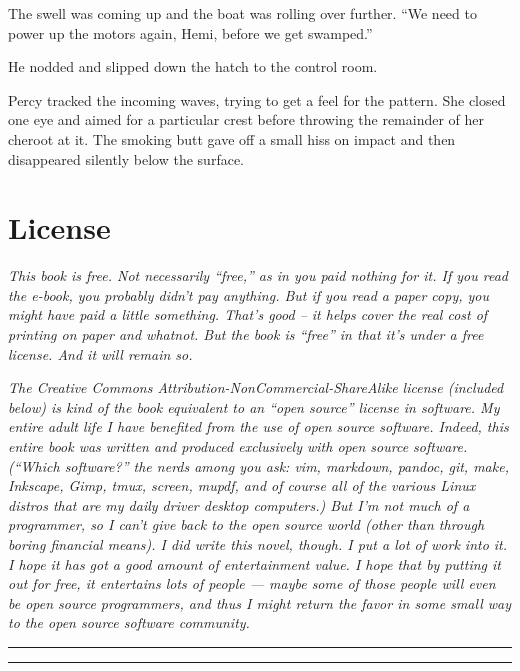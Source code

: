 \documentclass[
]{scrbook}
\begin{document}
The swell was coming up and the boat was rolling over further. ``We need
to power up the motors again, Hemi, before we get swamped.''

He nodded and slipped down the hatch to the control room.

Percy tracked the incoming waves, trying to get a feel for the pattern.
She closed one eye and aimed for a particular crest before throwing the
remainder of her cheroot at it. The smoking butt gave off a small hiss
on impact and then disappeared silently below the surface.

\newpage

\hypertarget{license}{%
\section{License}\label{license}}

\emph{This book is free. Not necessarily ``free,'' as in you paid
nothing for it. If you read the e-book, you probably didn't pay
anything. But if you read a paper copy, you might have paid a little
something. That's good -- it helps cover the real cost of printing on
paper and whatnot. But the book is ``free'' in that it's under a free
license. And it will remain so.}

\emph{The Creative Commons Attribution-NonCommercial-ShareAlike license
(included below) is kind of the book equivalent to an ``open source''
license in software. My entire adult life I have benefited from the use
of open source software. Indeed, this entire book was written and
produced exclusively with open source software. (``Which software?'' the
nerds among you ask: vim, markdown, pandoc, git, make, Inkscape, Gimp,
tmux, screen, mupdf, and of course all of the various Linux distros that
are my daily driver desktop computers.) But I'm not much of a
programmer, so I can't give back to the open source world (other than
through boring financial means). I did write this novel, though. I put a
lot of work into it. I hope it has got a good amount of entertainment
value. I hope that by putting it out for free, it entertains lots of
people --- maybe some of those people will even be open source
programmers, and thus I might return the favor in some small way to the
open source software community.}

\tiny

\begin{center}\rule{0.5\linewidth}{0.5pt}\end{center}

\begin{center}\rule{0.5\linewidth}{0.5pt}\end{center}
\end{document}

